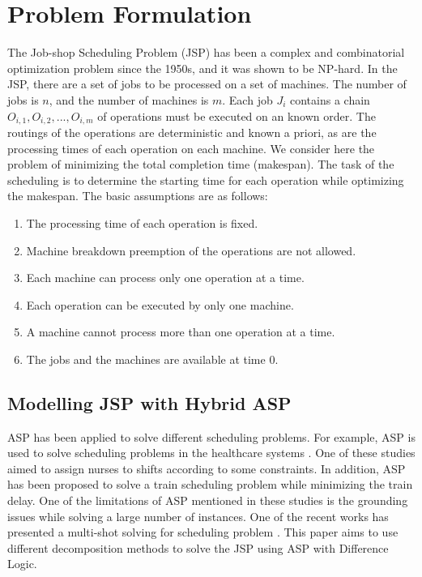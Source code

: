 \documentclass[runningheads]{llncs}
\begin{document}
\section{Problem Formulation}
The Job-shop Scheduling Problem (JSP) has been a complex and combinatorial optimization problem since the 1950s, and it was shown to be NP-hard. In the JSP, there are a set of jobs to be processed on a set of machines. The number of jobs is $n$, and the number of machines is $m$. Each job $J_i$ contains a chain $ O_{i,1}, O_{i,2},...,O_{i,m} $ of operations must be executed on an known order. The routings of the operations are deterministic and known a priori, as are the processing times of each operation on each machine. We consider here the problem of minimizing the total completion time (makespan). The task of the scheduling is to determine the starting time for each operation while optimizing the makespan. The basic assumptions are as follows:

\begin{enumerate}
	\item The processing time of each operation is fixed.
	\item Machine breakdown preemption of the operations are not allowed.
	\item Each machine can process only one operation at a time.
	\item Each operation can be executed by only one machine.
	\item A machine cannot process more than one operation at a time.
	\item The jobs and the machines are available at time $0$.
\end{enumerate}

\subsection{Modelling JSP with Hybrid ASP}
ASP has been applied to solve different scheduling problems. For example, ASP is used to solve scheduling problems in the healthcare systems \cite{dodaro2017nurse,dodaro2019asp}. One of these studies aimed to assign nurses to shifts according to some constraints\cite{dodaro2017nurse}. In addition, ASP has been proposed to solve a train scheduling problem while minimizing the train delay\cite{abels2019train}. One of the limitations of ASP mentioned in these studies is the grounding issues while solving a large number of instances. One of the recent works has presented a multi-shot solving for scheduling problem \cite{francescutto2021solving}. This paper aims to use different decomposition methods to solve the JSP using ASP with Difference Logic. 
\end{document}
